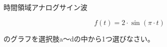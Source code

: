 時間領域アナログサイン波

\[
f(t) = 2 \cdot \sin( \pi \cdot t )
\]

\bigskip
\noindent  のグラフを選択肢a〜dの中から1つ選びなさい。
